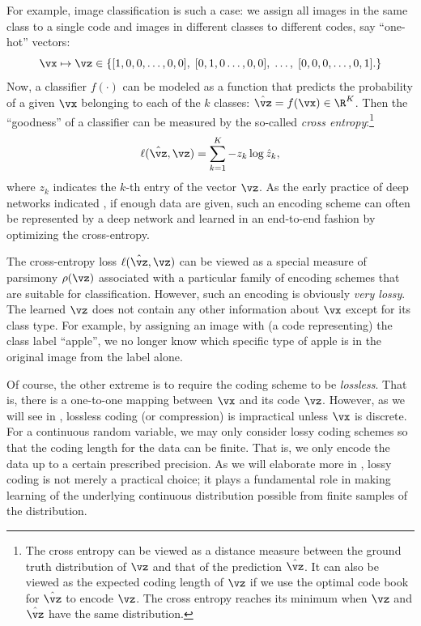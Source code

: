 \documentclass[../../book-main.tex]{subfiles}
\begin{document}
\begin{example}\label{example:image_classification_feature_learning}
    For example, image classification is such a case: we assign all
    images in the same class to a single code and images in different
    classes to different codes, say ``one-hot'' vectors:
    \begin{equation}
        \vx \mapsto \vz \in \{  [1, 0, 0, \ldots , 0, 0], \;  [0, 1,
        0 \ldots, 0, 0], \; \ldots, \;  [0,0,0, \ldots, 0, 1].\}
        \label{eqn:class-labels}
    \end{equation}
    Now, a classifier \(f(\cdot)\) can be modeled as a function that
    predicts the probability of a given \(\vx\) belonging to each of
    the \(k\) classes: \(\hat{\vz} = f(\vx) \in \R^{K}\). Then the
    ``goodness'' of a classifier can be measured by the so-called
    {\em cross entropy}:\footnote{The cross entropy can be viewed as
        a distance measure between the ground truth distribution of
        \(\vz\) and that of the prediction \(\hat{\vz}\). It can also be
        viewed as the expected coding length of \(\vz\) if we use the
        optimal code book for \(\hat{\vz}\) to encode \(\vz\). The cross
        entropy reaches its minimum when \(\vz\) and \(\hat{\vz}\) have
    the same distribution.}
    \begin{equation}
        \ell(\hat{\vz}, \vz) = \sum_{k=1}^{K} - z_{k} \log \hat{z}_{k},
    \end{equation}
    where \(z_{k}\) indicates the \(k\)-th entry of the vector
    \(\vz\). As the early practice of deep networks indicated
    \cite{krizhevsky2012imagenet}, if enough data are given, such an
    encoding scheme can often be represented by a deep network and
    learned in an end-to-end fashion by optimizing the cross-entropy.
\end{example}

The cross-entropy loss \(\ell(\hat{\vz}, \vz)\) can be viewed as a
special measure of parsimony \(\rho(\vz)\) associated with a
particular family of encoding schemes that are suitable for
classification. However, such an encoding is obviously \textit{very
lossy}. The learned \(\vz\) does not contain any other information
about \(\vx\) except for its class type. For example, by assigning an
image with (a code representing) the class label ``apple'', we no
longer know which specific type of apple is in the original image
from the label alone.

Of course, the other extreme is to require the coding scheme to be
\textit{lossless}. That is, there is a one-to-one mapping between
\(\vx\) and its code \(\vz\). However, as we will see in
, lossless coding (or compression) is
impractical unless \(\vx\) is discrete. For a continuous random
variable, we may only consider lossy coding schemes so that the
coding length for the data can be finite. That is, we only encode the
data up to a certain prescribed precision. As we will elaborate more
in , lossy coding is not merely a
practical choice; it plays a fundamental role in making learning of
the underlying continuous distribution possible from finite samples
of the distribution.
\end{document}
